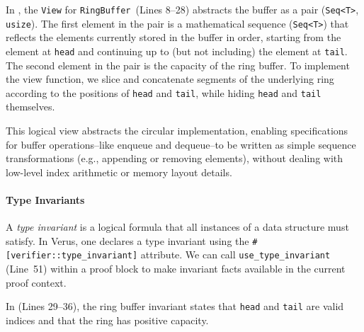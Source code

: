\begin{example}
\label{ex:view-bg}
In , the \texttt{View} for \texttt{RingBuffer}~(Lines 8--28) abstracts the buffer as a pair (\texttt{Seq<T>}, \texttt{usize}). The first element in the pair is a mathematical sequence (\texttt{Seq<T>}) that reflects the elements currently stored in the buffer in order, starting from the element at \texttt{head} and continuing up to (but not including) the element at \texttt{tail}. The second element in the pair is the capacity of the ring buffer. To implement the view function, we slice and concatenate segments of the underlying ring according to the positions of \texttt{head} and \texttt{tail}, while hiding \texttt{head} and \texttt{tail} themselves.

This logical view abstracts the circular implementation, enabling specifications for buffer operations--like enqueue and dequeue--to be written as simple sequence transformations (e.g., appending or removing elements), without dealing with low-level index arithmetic or memory layout details.
\end{example}

\paragraph{Type Invariants}
\label{ex:invariant-bg}
A \emph{type invariant} is a logical formula that all instances of a data structure must satisfy. In Verus, one declares a type invariant using the \texttt{\#[verifier::type\_invariant]} attribute. We can call \texttt{use\_type\_invariant} (Line~51) within a proof block to make invariant facts available in the current proof context.

\begin{example}
In  (Lines 29--36), the ring buffer invariant states that \texttt{head} and \texttt{tail} are valid indices and that the ring has positive capacity.
\end{example}


